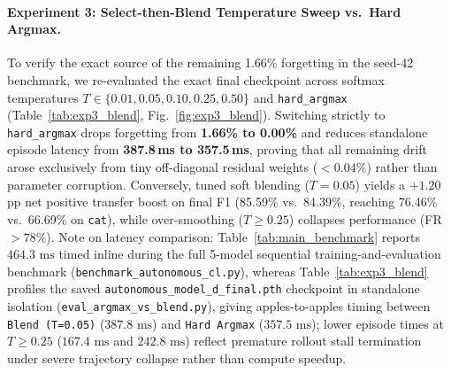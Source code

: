 \documentclass[10pt,twocolumn]{article}
\begin{document}
\paragraph{Experiment 3: Select-then-Blend Temperature Sweep vs.\ Hard Argmax.}
To verify the exact source of the remaining 1.66\% forgetting in the seed-42 benchmark, we re-evaluated the exact final checkpoint across softmax temperatures $T \in \{0.01, 0.05, 0.10, 0.25, 0.50\}$ and \texttt{hard\_argmax} (Table~\ref{tab:exp3_blend}, Fig.~\ref{fig:exp3_blend}). Switching strictly to \texttt{hard\_argmax} drops forgetting from \textbf{1.66\% to 0.00\%} and reduces standalone episode latency from \textbf{387.8\,ms to 357.5\,ms}, proving that all remaining drift arose exclusively from tiny off-diagonal residual weights ($<0.04\%$) rather than parameter corruption. Conversely, tuned soft blending ($T=0.05$) yields a $+1.20$\,pp net positive transfer boost on final F1 (85.59\% vs.\ 84.39\%, reaching 76.46\% vs.\ 66.69\% on \texttt{cat}), while over-smoothing ($T \ge 0.25$) collapses performance (FR $>78\%$). Note on latency comparison: Table~\ref{tab:main_benchmark} reports $464.3\text{ ms}$ timed inline during the full 5-model sequential training-and-evaluation benchmark (\texttt{benchmark\_autonomous\_cl.py}), whereas Table~\ref{tab:exp3_blend} profiles the saved \texttt{autonomous\_model\_d\_final.pth} checkpoint in standalone isolation (\texttt{eval\_argmax\_vs\_blend.py}), giving apples-to-apples timing between \texttt{Blend (T=0.05)} ($387.8\text{ ms}$) and \texttt{Hard Argmax} ($357.5\text{ ms}$); lower episode times at $T \ge 0.25$ ($167.4\text{ ms}$ and $242.8\text{ ms}$) reflect premature rollout stall termination under severe trajectory collapse rather than compute speedup.

\begin{table}[t]
\centering
\caption{\textbf{Experiment 3: Select-then-Blend vs.\ Hard Argmax on \texttt{autonomous\_model\_d\_final.pth}.}}
\label{tab:exp3_blend}
\setlength{\tabcolsep}{3.5pt}
\renewcommand{\arraystretch}{1.12}
\end{table}
\end{document}
